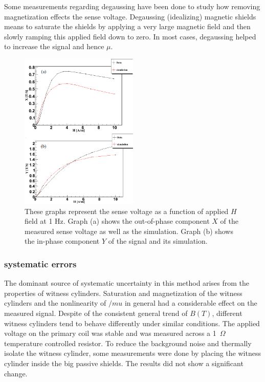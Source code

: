 \documentclass[review]{elsarticle}
\begin{document}
Some measurements regarding degaussing have been done to study how removing magnetization effects the sense voltage. Degaussing (idealizing) magnetic shields means to saturate the shields by applying a very large magnetic field and then slowly ramping this applied field down to zero. In most cases, degaussing helped to increase the signal and hence $\mu$.

\begin{figure}[h!]
\begin{center}
   \includegraphics[width=0.5\textwidth]{data_and_simulation3.PNG}
    \caption{These graphs represent the sense voltage as a function of applied $H$ field at 1 Hz. Graph (a) shows the out-of-phase component $X$ of the measured sense voltage as well as the simulation. Graph (b) shows the in-phase component $Y$ of the signal and its simulation.}
    \label{fig:data_and_simulation}
    \end{center}
\end{figure} 
\subsubsection{systematic errors}
The dominant source of systematic uncertainty in this method arises from the properties of witness cylinders. Saturation and magnetization of the witness cylinders and the nonlinearity of $/mu$ in general had a considerable effect on the measured signal. Despite of the consistent general trend of $B(T)$, different witness cylinders tend to behave differently under similar conditions. The applied voltage on the primary coil was stable and was measured across a 1~$\Omega$ temperature controlled resistor. To reduce the background noise and thermally isolate the witness cylinder, some measurements were done by placing the witness cylinder inside the big passive shields. The results did not show a significant change.
\end{document}
